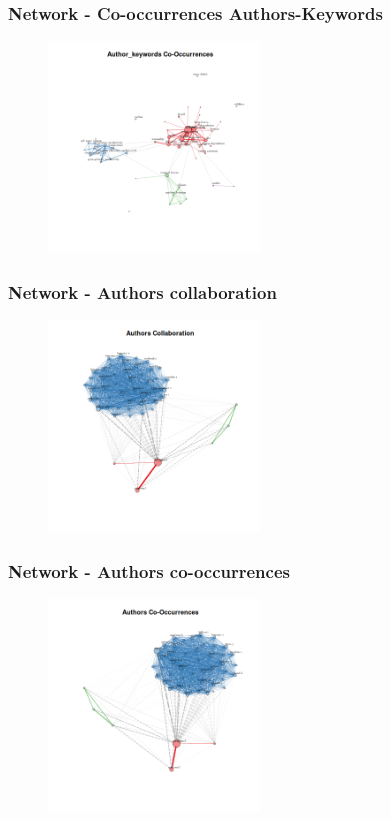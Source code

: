 \documentclass[aspectratio=169]{beamer}
\begin{document}
\begin{frame}
	\frametitle{Network - Co-occurrences Authors-Keywords}
	\begin{figure}
		\centering
		\includegraphics[width=0.5\textwidth]
		{figures/bnet_author_keywords_co-occurrences.png}
	\end{figure}
\end{frame}

\begin{frame}
	\frametitle{Network - Authors collaboration}
	\begin{figure}
		\centering
		\includegraphics[width=0.5\textwidth]
		{figures/bnet_authors_collaboration.png}
	\end{figure}
\end{frame}

\begin{frame}
	\frametitle{Network - Authors co-occurrences}
	\begin{figure}
		\centering
		\includegraphics[width=0.5\textwidth]
		{figures/bnet_authors_co-occurrences.png}
	\end{figure}
\end{frame}
\end{document}
